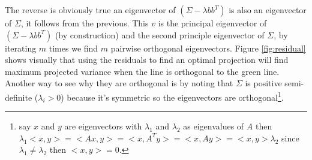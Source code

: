 The reverse is obviously true an eigenvector of 
$(\Sigma - \lambda bb^T)$ is also an eigenvector of
$\Sigma$, it follows from the previous. This $v$ is 
the principal eigenvector of $(\Sigma - \lambda bb^T)$ 
(by construction) and the second principle eigenvector 
of $\Sigma$, by iterating $m$ times we find $m$ pairwise 
orthogonal eigenvectors. Figure \ref{fig:residual} shows 
visually that using the residuals to find an optimal 
projection will find maximum projected variance when 
the line is orthogonal to the green line. Another way to 
see why they are orthogonal is by noting that $\Sigma$ is 
positive semi-definite ($\lambda_i > 0$) because it's 
symmetric so the eigenvectors are orthogonal\footnote{say 
$x$ and $y$ are eigenvectors with $\lambda_1$ and 
$\lambda_2$ as eigenvalues of $A$ then $\lambda_1 <x,y> 
= <Ax,y> = <x,A^Ty> = <x,Ay>=<x,y>\lambda_2$ since $\lambda_1
\neq \lambda_2$ then $<x,y>=0$.}.

